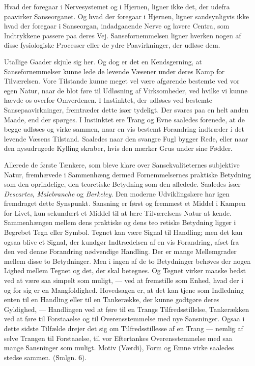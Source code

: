 \documentclass[12pt,a4paper]{book}
\newcommand{\opage}[1]{\marginnote{\footnotesize\textit{[#1]}}}
\begin{document}
Hvad der foregaar i Nervesystemet og i Hjernen, ligner ikke det, der
udefra paavirker Sanseorganet. Og hvad der foregaar i Hjernen, ligner
sandsynligvis ikke hvad der foregaar i Sanseorgan, indadgaaende Nerve og
lavere Centra, som Indtrykkene passere paa deres Vej. Sansefornemmelsen
ligner hverken nogen af disse fysiologiske Processer eller de ydre
Paavirkninger, der udløse dem.

Utallige Gaader skjule sig her. Og dog er det en Kendsgerning, at
Sansefornemmelser kunne lede de levende Væsener under deres Kamp for
Tilværelsen. Vore Tilstande kunne meget vel være afgørende bestemte ved
vor egen Natur, naar de blot føre til Udløsning af Virksomheder, ved
hvilke vi kunne hævde os overfor Omverdenen. I Instinktet, der udløses
ved bestemte Sansepaavirkninger, fremtræder dette især tydeligt. Der
svares paa en helt anden Maade, end der spørges. I Instinktet ere Trang
og Evne saaledes forenede, at de begge udløses og virke sammen, naar en
vis bestemt Forandring indtræder i det levende Væsens Tilstand. Saaledes
naar den svangre Fugl bygger Rede, eller naar den nysudrugede Kylling
skraber, hvis den mærker Grus under sine Fødder.

Allerede de første Tænkere, som bleve klare over Sansekvaliteternes
subjektive Natur, fremhævede i Sammenhæng dermed Fornemmelsernes
praktiske Betydning som den oprindelige, den teoretiske Betydning som
den afledede. Saaledes især \emph{Descartes}, \emph{Malebranche} og
\emph{Berkeley}. Den moderne Udviklingslære har igen fremdraget dette
Synspunkt. Sansning er først og fremmest et Middel i Kampen for Livet,
kun sekundært et Middel til at lære Tilværelsens Natur at kende.
Sammenhængen mellem dens praktiske og dens teo%
\opage{43}retiske Betydning ligger i
Begrebet Tegn eller Symbol. Tegnet kan være Signal til Handling; men det
kan ogsaa blive et Signal, der kundgør Indtrædelsen af en vis
Forandring, afset fra den ved denne Forandring nødvendige Handling. Der
er mange Mellemgrader mellem disse to Betydninger. Men i ingen af de to
Betydninger behøves der nogen Lighed mellem Tegnet og det, der skal
betegnes. Og Tegnet virker maaske bedst ved at være saa simpelt som
muligt, --- ved at fremstille som Enhed, hvad der i og for sig er en
Mangfoldighed. Hovedsagen er, at det kan tjene som Indledning enten til
en Handling eller til en Tankerække, der kunne godtgøre deres Gyldighed,
--- Handlingen ved at føre til en Trangs Tilfredsstillelse, Tankerækken
ved at føre til Forstaaelse og til Overensstemmelse med nye Sansninger.
Ogsaa i dette sidste Tilfælde drejer det sig om Tilfredsstillesse af en Trang --- nemlig af selve Trangen til Forstaaelse, til vor Eftertankes
Overensstemmelse med saa mange Sansninger som muligt. Motiv (Værdi),
Form og Emne virke saaledes stedse sammen. (Smlgn. 6).
\end{document}
